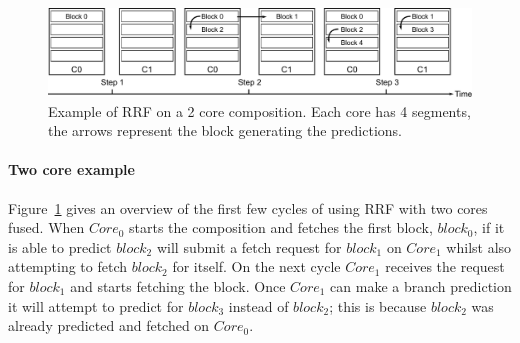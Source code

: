 \begin{figure}[t]
    \centering
    \includegraphics[width=1\textwidth]{chapter3/graphics/fetching-model.pdf}
\vspace{-2em}
    \caption{Example of RRF on a 2 core composition. Each core has 4 segments, the arrows represent the block generating the predictions.}
    \label{fig:new_fetch_ex}
	\vspace{1em}
\end{figure}
	
\paragraph*{Two core example}
	
Figure~\ref{fig:new_fetch_ex} gives an overview of the first few cycles of using RRF with two cores fused.
When $Core_0$ starts the composition and fetches the first block, $block_0$, if it is able to predict $block_2$ will submit a fetch request for $block_1$ on $Core_1$ whilst also attempting to fetch $block_2$ for itself.
On the next cycle $Core_1$ receives the request for $block_1$ and starts fetching the block.
Once $Core_1$ can make a branch prediction it will attempt to predict for $block_3$ instead of $block_2$; this is because $block_2$ was already predicted and fetched on $Core_0$.



